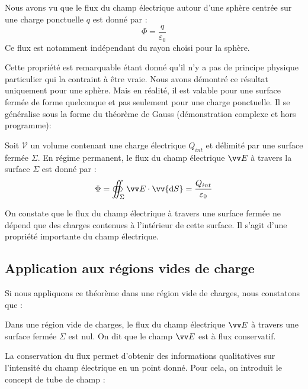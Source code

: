 \documentclass[11pt,fleqn]{book} %
\newcommand{\dd}{\mathrm{d}}
\begin{document}
Nous avons vu que le flux du champ électrique autour d'une sphère centrée sur une charge ponctuelle $q$ est donné par :
\begin{equation}
    \Phi = \frac{q}{\varepsilon_0}
\end{equation}
Ce flux est notamment indépendant du rayon choisi pour la sphère.

Cette propriété est remarquable étant donné qu'il n'y a pas de principe physique particulier qui la contraint à être vraie. Nous avons démontré ce résultat uniquement pour une sphère. Mais en réalité, il est valable pour une surface fermée de forme quelconque et pas seulement pour une charge ponctuelle. Il se généralise sous la forme du théorème de Gauss (démonstration complexe et hors programme):

\begin{theorem}
    Soit $\mathcal{V}$ un volume contenant une charge électrique $Q_{int}$ et délimité par une surface fermée $\Sigma$. En régime permanent, le flux du champ électrique $\vv E$ à travers la surface $\Sigma$ est donné par :
    \begin{equation}
        \Phi = \oiint_\Sigma \vv E \cdot \vv{\dd S} = \frac{Q_{int}}{\varepsilon_0}
    \end{equation}
\end{theorem}

On constate que le flux du champ électrique à travers une surface fermée ne dépend que des charges contenues à l'intérieur de cette surface. Il s'agit d'une propriété importante du champ électrique.

\subsection{Application aux régions vides de charge}

Si nous appliquons ce théorème dans une région vide de charges, nous constatons que :

\begin{proposition}
    Dans une région vide de charges, le flux du champ électrique $\vv E$ à travers une surface fermée $\Sigma$ est nul. On dit que le champ $\vv E$ est à flux conservatif.
\end{proposition}

La conservation du flux permet d'obtenir des informations qualitatives sur l'intensité du champ électrique en un point donné. Pour cela, on introduit le concept de tube de champ :
\end{document}
